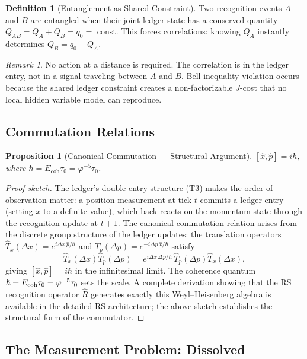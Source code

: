 \documentclass[12pt,a4paper]{article}
\newtheorem{proposition}[theorem]{Proposition}
\theoremstyle{definition}
\newtheorem{definition}[theorem]{Definition}
\theoremstyle{remark}
\newtheorem{remark}[theorem]{Remark}
\begin{document}
\begin{definition}[Entanglement as Shared Constraint]
Two recognition events $A$ and $B$ are entangled when their joint
ledger state has a conserved quantity $Q_{AB} = Q_A + Q_B = q_0 =$
const.  This forces correlations: knowing $Q_A$ instantly determines
$Q_B = q_0 - Q_A$.
\end{definition}

\begin{remark}
No action at a distance is required.  The correlation is in the ledger
entry, not in a signal traveling between $A$ and $B$.  Bell inequality
violation occurs because the shared ledger constraint creates a
non-factorizable $J$-cost that no local hidden variable model can
reproduce.
\end{remark}

\subsection{Commutation Relations}

\begin{proposition}[Canonical Commutation --- Structural Argument]
$[\hat{x}, \hat{p}] = i\hbar$, where $\hbar = E_{\mathrm{coh}}\tau_0
= \varphi^{-5}\tau_0$.
\end{proposition}

\begin{proof}[Proof sketch]
The ledger's double-entry structure (T3) makes the order of
observation matter: a position measurement at tick $t$ commits a
ledger entry (setting $x$ to a definite value), which back-reacts on
the momentum state through the recognition update at $t+1$.  The
canonical commutation relation arises from the discrete group structure
of the ledger updates: the translation operators $\hat{T}_x(\Delta x)
= e^{i\Delta x\,\hat{p}/\hbar}$ and $\hat{T}_p(\Delta p)
= e^{-i\Delta p\,\hat{x}/\hbar}$ satisfy
\[
  \hat{T}_x(\Delta x)\hat{T}_p(\Delta p)
  = e^{i\Delta x\,\Delta p/\hbar}\,
    \hat{T}_p(\Delta p)\hat{T}_x(\Delta x),
\]
giving $[\hat{x}, \hat{p}] = i\hbar$ in the infinitesimal limit.
The coherence quantum $\hbar = E_{\rm coh}\tau_0 = \varphi^{-5}\tau_0$
sets the scale.  A complete derivation showing that the RS recognition
operator $\widehat{R}$ generates exactly this Weyl--Heisenberg algebra
is available in the detailed RS architecture; the above sketch
establishes the structural form of the commutator.
\end{proof}

\subsection{The Measurement Problem: Dissolved}
\end{document}
